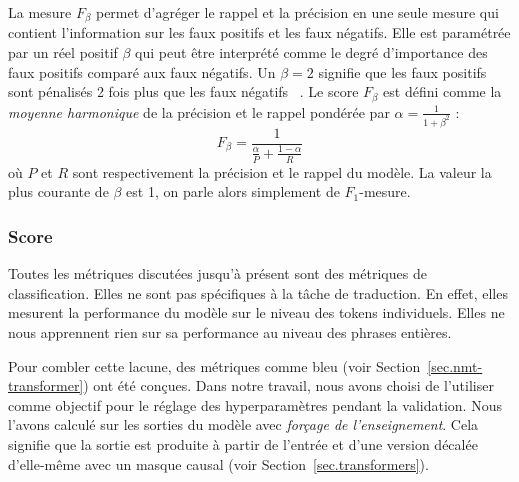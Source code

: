 La mesure \(F_\beta\) permet d'agréger le rappel et la précision en une seule mesure
qui contient l'information sur les faux positifs et les faux négatifs.
Elle est paramétrée par un réel positif \(\beta\) 
qui peut être interprété comme le degré d'importance des faux positifs comparé aux faux négatifs.
Un \(\beta = 2\) signifie que les faux positifs sont pénalisés 2 fois plus que les faux négatifs%
~\cite{books/bu/Rijsbergen79}.
Le score \(F_\beta\) est défini comme la \emph{moyenne harmonique} de la précision et le rappel
pondérée par \(\alpha = \frac{1}{1 + \beta^2}\) :
\begin{equation}
    \label{eq.fbeta}
    F_\beta = \frac{1}{\frac{\alpha}{P} + \frac{1 - \alpha}{R}}
\end{equation}
où \(P\) et \(R\) sont respectivement la précision et le rappel du modèle.
La valeur la plus courante de \(\beta\) est 1,
on parle alors simplement de \(F_1\)-mesure.


\subsubsection{Score }

Toutes les métriques discutées jusqu'à présent sont des métriques de classification.
Elles ne sont pas spécifiques à la tâche de traduction.
En effet, elles mesurent la performance du modèle sur le niveau des tokens individuels.
Elles ne nous apprennent rien sur sa performance au niveau des phrases entières.

Pour combler cette lacune, des métriques comme \gls{bleu} (voir Section~\ref{sec.nmt-transformer}) ont été conçues.
Dans notre travail, nous avons choisi de l'utiliser comme objectif 
pour le réglage des hyperparamètres pendant la validation.
Nous l'avons calculé sur les sorties du modèle avec \emph{forçage de l'enseignement}.
Cela signifie que la sortie est produite à partir de l'entrée et d'une version décalée 
d'elle-même avec un masque causal (voir Section~\ref{sec.transformers}).


